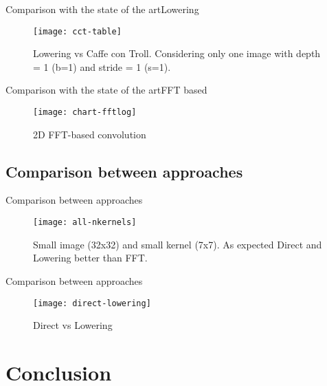 \documentclass{beamer}
\begin{document}
\begin{frame}{Comparison with the state of the art}{Lowering}
\begin{figure}[ht] \label{fig1} 
\texttt{[image: cct-table]}
 \caption{Lowering vs Caffe con Troll. Considering only one image with depth = 1 (b=1) and stride = 1 (s=1).} 
\end{figure}
\end{frame}

\begin{frame}{Comparison with the state of the art}{FFT based}
\begin{figure}[htc] \label{fig1} 
\texttt{[image: chart-fftlog]}
 \caption{2D FFT-based convolution} 
\end{figure}
\end{frame}

\subsection{Comparison between approaches}

\begin{frame}{Comparison between approaches}
\begin{figure}[ht] \label{fig1} 
\texttt{[image: all-nkernels]}
 \caption{Small image (32x32) and small kernel (7x7). As expected Direct and Lowering better than FFT.} 
\end{figure}
\end{frame}

\begin{frame}{Comparison between approaches}
\begin{figure}[ht] \label{fig1} 
\texttt{[image: direct-lowering]}
 \caption{Direct vs Lowering} 
\end{figure}
\end{frame}

\section{Conclusion}
\end{document}
